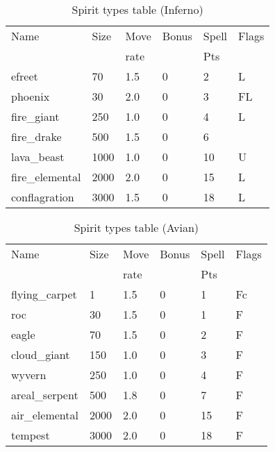 \begin{same}
\begin{table}[hbpt]
\caption{Spirit types table (Inferno)}
\begin{center}
\begin{tabular}{ || l | l | l | l | l | l || }
\hline
Name            & Size & Move & Bonus &Spell&Flags\\
                &      & rate &       &Pts  &\\
\hline
efreet          &   70 & 1.5 &   0 &  2 &L\\
phoenix         &   30 & 2.0 &   0 &  3 &FL\\
fire_giant      &  250 & 1.0 &   0 &  4 &L\\
fire_drake      &  500 & 1.5 &   0 &  6 &\\
lava_beast      & 1000 & 1.0 &   0 & 10 &U\\
fire_elemental  & 2000 & 2.0 &   0 & 15 &L\\
conflagration   & 3000 & 1.5 &   0 & 18 &L\\
\hline
\end{tabular}
\end{center}
\end{table}
\end{same}
\begin{same}
\begin{table}[hbpt]
\caption{Spirit types table (Avian)}
\begin{center}
\begin{tabular}{ || l | l | l | l | l | l || }
\hline
Name            & Size & Move & Bonus &Spell&Flags\\
                &      & rate &       &Pts  &\\
\hline
flying_carpet   &    1 & 1.5 &   0 &  1 &Fc\\
roc             &   30 & 1.5 &   0 &  1 &F\\
eagle           &   70 & 1.5 &   0 &  2 &F\\
cloud_giant     &  150 & 1.0 &   0 &  3 &F\\
wyvern          &  250 & 1.0 &   0 &  4 &F\\
areal_serpent   &  500 & 1.8 &   0 &  7 &F\\
air_elemental   & 2000 & 2.0 &   0 & 15 &F\\
tempest         & 3000 & 2.0 &   0 & 18 &F\\
\hline
\end{tabular}
\end{center}
\end{table}
\end{same}
